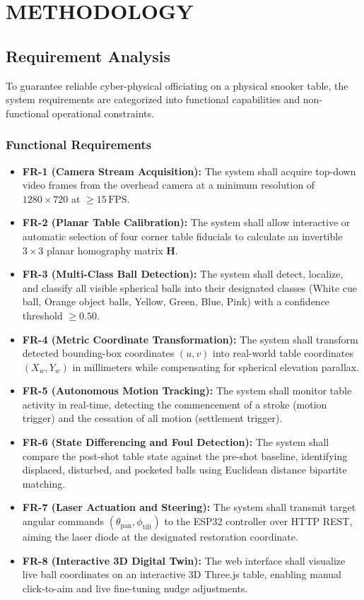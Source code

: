 \chapter{METHODOLOGY}

\section{Requirement Analysis}
To guarantee reliable cyber-physical officiating on a physical snooker table, the system requirements are categorized into functional capabilities and non-functional operational constraints.

\subsection{Functional Requirements}
\begin{itemize}
    \item \textbf{FR-1 (Camera Stream Acquisition):} The system shall acquire top-down video frames from the overhead camera at a minimum resolution of $1280 \times 720$ at $\ge 15\,\text{FPS}$.
    \item \textbf{FR-2 (Planar Table Calibration):} The system shall allow interactive or automatic selection of four corner table fiducials to calculate an invertible $3 \times 3$ planar homography matrix $\mathbf{H}$.
    \item \textbf{FR-3 (Multi-Class Ball Detection):} The system shall detect, localize, and classify all visible spherical balls into their designated classes (White cue ball, Orange object balls, Yellow, Green, Blue, Pink) with a confidence threshold $\ge 0.50$.
    \item \textbf{FR-4 (Metric Coordinate Transformation):} The system shall transform detected bounding-box coordinates $(u, v)$ into real-world table coordinates $(X_w, Y_w)$ in millimeters while compensating for spherical elevation parallax.
    \item \textbf{FR-5 (Autonomous Motion Tracking):} The system shall monitor table activity in real-time, detecting the commencement of a stroke (motion trigger) and the cessation of all motion (settlement trigger).
    \item \textbf{FR-6 (State Differencing and Foul Detection):} The system shall compare the post-shot table state against the pre-shot baseline, identifying displaced, disturbed, and pocketed balls using Euclidean distance bipartite matching.
    \item \textbf{FR-7 (Laser Actuation and Steering):} The system shall transmit target angular commands $(\theta_{\text{pan}}, \phi_{\text{tilt}})$ to the ESP32 controller over HTTP REST, aiming the laser diode at the designated restoration coordinate.
    \item \textbf{FR-8 (Interactive 3D Digital Twin):} The web interface shall visualize live ball coordinates on an interactive 3D Three.js table, enabling manual click-to-aim and live fine-tuning nudge adjustments.
\end{itemize}

